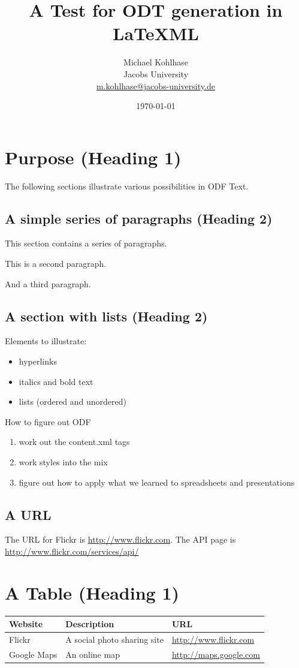 \documentclass{article}
\title{A Test for ODT generation in LaTeXML}
\author{Michael Kohlhase\\Jacobs University\\\url{m.kohlhase@jacobs-university.de}}
\date{\today}
\begin{document}
\maketitle

\section{Purpose (Heading 1)}

The following sections illustrate various possibilities in ODF Text.

\subsection{A simple series of paragraphs (Heading 2)}

This section contains a series of paragraphs.

This is a second paragraph.

And a third paragraph.

\subsection{A section with lists (Heading 2)}
Elements to illustrate:
\begin{itemize}
\item hyperlinks
\item italics and bold text
\item lists (ordered and unordered)
\end{itemize}
How to figure out ODF
\begin{enumerate}
\item work out the content.xml tags
\item  work styles into the mix
\item  figure out how to apply what we learned to spreadsheets and presentations
\end{enumerate}
\subsection{A URL}
The URL for Flickr is \url{http://www.flickr.com}.  The API page is \url{http://www.flickr.com/services/api/}

\section{A Table (Heading 1)}
\begin{tabular}{|l|l|l|}\hline
  Website & Description & URL \\\hline
  Flickr & A social photo sharing site & \url{http://www.flickr.com}\\\hline 
  Google Maps & An online map & \url{http://maps.google.com}\\\hline
\end{tabular}
\end{document}
